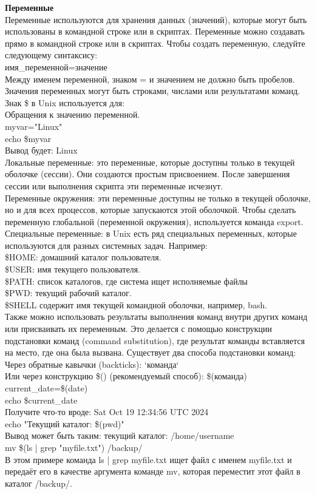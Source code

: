 \noindent \textbf{Переменные} \\
Переменные используются для хранения данных (значений), которые могут быть использованы в командной строке или в скриптах. Переменные можно создавать прямо в командной строке или в скриптах. Чтобы создать переменную, следуйте следующему синтаксису: \\
имя\_переменной=значение \\
Между именем переменной, знаком = и значением не должно быть пробелов. \\
Значения переменных могут быть строками, числами или результатами команд. \\
Знак \$ в Unix используется для: \\
Обращения к значению переменной. \\
myvar="Linux" \\
echo \$myvar \\
Вывод будет: Linux \\
Локальные переменные: это переменные, которые доступны только в текущей оболочке (сессии). Они создаются простым присвоением. После завершения сессии или выполнения скрипта эти переменные исчезнут. \\
Переменные окружения: эти переменные доступны не только в текущей оболочке, но и для всех процессов, которые запускаются этой оболочкой. Чтобы сделать переменную глобальной (переменной окружения), используется команда export. \\
Специальные переменные: в Unix есть ряд специальных переменных, которые используются для разных системных задач. Например: \\
\$HOME: домашний каталог пользователя. \\
\$USER: имя текущего пользователя. \\
\$PATH: список каталогов, где система ищет исполняемые файлы \\
\$PWD: текущий рабочий каталог. \\
\$SHELL содержит имя текущей командной оболочки, например, bash. \\
Также можно использовать результаты выполнения команд внутри других команд или присваивать их переменным. Это делается с помощью конструкции подстановки команд (command substitution), где результат команды вставляется на место, где она была вызвана. Существует два способа подстановки команд: \\
Через обратные кавычки (backticks): `команда` \\
Или через конструкцию \$() (рекомендуемый способ): \$(команда) \\
current\_date=\$(date) \\
echo \$current\_date \\
Получите что-то вроде: Sat Oct 19 12:34:56 UTC 2024 \\
echo "Текущий каталог: \$(pwd)" \\
Вывод может быть таким: текущий каталог: /home/username \\
mv \$(ls | grep "myfile.txt") /backup/ \\
В этом примере команда ls | grep myfile.txt ищет файл с именем myfile.txt и передаёт его в качестве аргумента команде mv, которая переместит этот файл в каталог /backup/. \\

